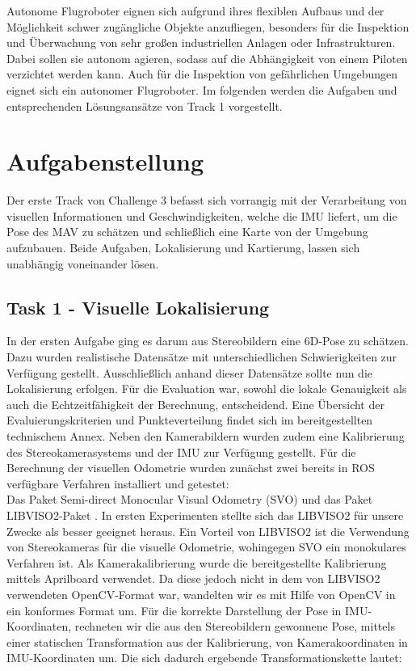 \documentclass[12pt,titlepage, a4paper]{article}
\begin{document}
Autonome Flugroboter eignen sich aufgrund ihres flexiblen Aufbaus und der Möglichkeit schwer zugängliche Objekte anzufliegen, besonders für die Inspektion und Überwachung von sehr großen industriellen
Anlagen oder Infrastrukturen. Dabei sollen sie autonom agieren, sodass auf die Abhängigkeit von einem Piloten verzichtet werden kann.
Auch für die Inspektion von gefährlichen Umgebungen eignet sich ein autonomer Flugroboter.
Im folgenden werden die Aufgaben und entsprechenden Lösungsansätze von Track 1 vorgestellt.





\section{Aufgabenstellung} 
Der erste Track von Challenge 3 befasst sich vorrangig mit der Verarbeitung von visuellen Informationen und Geschwindigkeiten, welche die IMU liefert, um die Pose des MAV zu schätzen
und schließlich eine Karte von der Umgebung aufzubauen. Beide Aufgaben, Lokalisierung und Kartierung, lassen sich unabhängig voneinander lösen.

\subsection{Task 1 - Visuelle Lokalisierung}
In der ersten Aufgabe ging es darum aus Stereobildern eine 6D-Pose zu schätzen. Dazu wurden realistische Datensätze mit unterschiedlichen Schwierigkeiten zur Verfügung gestellt.
Ausschließlich anhand dieser Datensätze sollte nun die Lokalisierung erfolgen. Für die Evaluation war, sowohl die lokale Genauigkeit als auch die Echtzeitfähigkeit der Berechnung, entscheidend.
Eine Übersicht der Evaluierungskriterien und Punkteverteilung findet sich im bereitgestellten technischem Annex\cite{eurocannex}.
Neben den Kamerabildern wurden zudem eine Kalibrierung des Stereokamerasystems und der IMU zur Verfügung gestellt. 
Für die Berechnung der visuellen Odometrie wurden zunächst zwei bereits in ROS verfügbare Verfahren installiert und getestet:\\
Das Paket Semi-direct Monocular Visual Odometry (SVO)\cite{EPFL-CONF-199740} und das Paket \mbox{LIBVISO2}-Paket \cite{Geiger11}.
In ersten Experimenten stellte sich das \mbox{LIBVISO2} für unsere Zwecke als besser geeignet heraus. Ein Vorteil von LIBVISO2 ist die Verwendung von Stereokameras für die visuelle Odometrie, wohingegen SVO ein monokulares Verfahren ist.
Als Kamerakalibrierung wurde die bereitgestellte Kalibrierung mittels Aprilboard verwendet. Da diese jedoch nicht in dem von \mbox{LIBVISO2} verwendeten OpenCV-Format war, wandelten wir es mit Hilfe von OpenCV
in ein konformes Format um.
Für die korrekte Darstellung der Pose in IMU-Koordinaten, rechneten wir die aus den Stereobildern gewonnene Pose, mittels einer statischen Transformation aus der Kalibrierung, von Kamerakoordinaten 
in IMU-Koordinaten um.
Die sich dadurch ergebende Transformationskette lautet:\\
\end{document}
